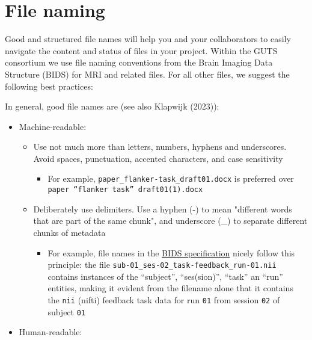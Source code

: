 \documentclass[
  letterpaper,
  DIV=11,
  numbers=noendperiod]{scrreprt}
\providecommand{\tightlist}{%
  \setlength{\itemsep}{0pt}\setlength{\parskip}{0pt}}\usepackage{longtable,booktabs,array}
\begin{document}
\hypertarget{file-naming}{%
\chapter{File naming}\label{file-naming}}

Good and structured file names will help you and your collaborators to
easily navigate the content and status of files in your project. Within
the GUTS consortium we use file naming conventions from the Brain
Imaging Data Structure (BIDS) for MRI and related files. For all other
files, we suggest the following best practices:

In general, good file names are (see also Klapwijk (2023)):

\begin{itemize}
\item
  Machine-readable:

  \begin{itemize}
  \item
    Use not much more than letters, numbers, hyphens and underscores.
    Avoid spaces, punctuation, accented characters, and case sensitivity

    \begin{itemize}
    \tightlist
    \item
      For example, \texttt{paper\_flanker-task\_draft01.docx} is
      preferred over \texttt{paper\ “flanker\ task”\ draft01(1).docx}
    \end{itemize}
  \item
    Deliberately use delimiters. Use a hyphen (-) to mean "different
    words that are part of the same chunk", and underscore (\_) to
    separate different chunks of metadata

    \begin{itemize}
    \tightlist
    \item
      For example, file names in the
      \href{https://bids.neuroimaging.io/}{BIDS specification} nicely
      follow this principle: the file
      \texttt{sub-01\_ses-02\_task-feedback\_run-01.nii} contains
      instances of the ``subject'', ``ses(sion)'', ``task'' an ``run''
      entities, making it evident from the filename alone that it
      contains the \texttt{nii} (nifti) feedback task data for run
      \texttt{01} from session \texttt{02} of subject \texttt{01}
    \end{itemize}
  \end{itemize}
\item
  Human-readable:


\end{itemize}
\end{document}
